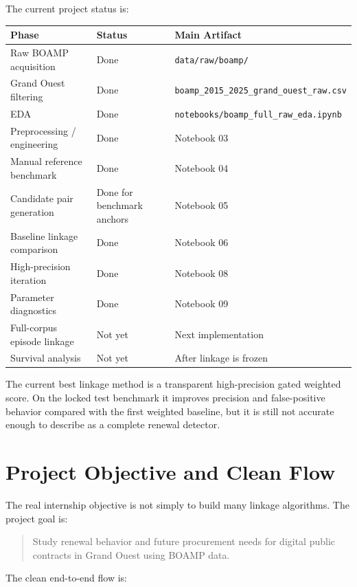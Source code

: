 \documentclass[11pt,a4paper]{article}
\newcommand{\pathcode}[1]{{\small\nolinkurl{#1}}}
\begin{document}
The current project status is:

\begin{center}
\small
\begin{tabularx}{\textwidth}{p{}p{}X}
\toprule
Phase & Status & Main Artifact \\
\midrule
Raw BOAMP acquisition & Done & \pathcode{data/raw/boamp/} \\
Grand Ouest filtering & Done & \pathcode{boamp_2015_2025_grand_ouest_raw.csv} \\
EDA & Done & \pathcode{notebooks/boamp_full_raw_eda.ipynb} \\
Preprocessing / engineering & Done & Notebook 03 \\
Manual reference benchmark & Done & Notebook 04 \\
Candidate pair generation & Done for benchmark anchors & Notebook 05 \\
Baseline linkage comparison & Done & Notebook 06 \\
High-precision iteration & Done & Notebook 08 \\
Parameter diagnostics & Done & Notebook 09 \\
Full-corpus episode linkage & Not yet & Next implementation \\
Survival analysis & Not yet & After linkage is frozen \\
\bottomrule
\end{tabularx}
\end{center}

The current best linkage method is a transparent high-precision gated weighted score. On the locked test benchmark it improves precision and false-positive behavior compared with the first weighted baseline, but it is still not accurate enough to describe as a complete renewal detector.

\section*{Project Objective and Clean Flow}

The real internship objective is not simply to build many linkage algorithms. The project goal is:

\begin{quote}
Study renewal behavior and future procurement needs for digital public contracts in Grand Ouest using BOAMP data.
\end{quote}

The clean end-to-end flow is:
\end{document}
